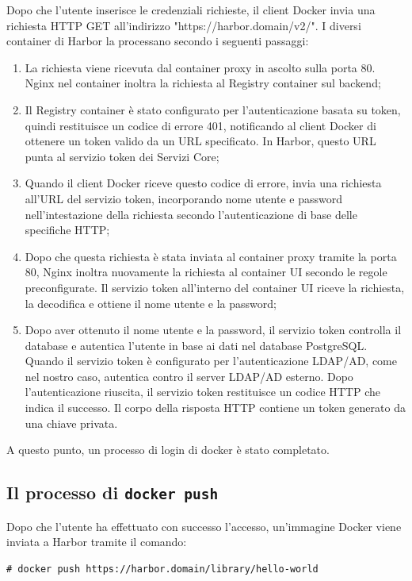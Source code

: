 \documentclass[12pt,a4paper]{report}
\begin{document}
Dopo che l'utente inserisce le credenziali richieste, il client Docker invia una richiesta HTTP GET all'indirizzo "https://harbor.domain/v2/". I diversi container di Harbor la processano secondo i seguenti passaggi:
\begin{enumerate}
    \item La richiesta viene ricevuta dal container proxy in ascolto sulla porta 80. Nginx nel container inoltra la richiesta al Registry container sul backend;
    \item Il Registry container è stato configurato per l'autenticazione basata su token, quindi restituisce un codice di errore 401, notificando al client Docker di ottenere un token valido da un URL specificato. In Harbor, questo URL punta al servizio token dei Servizi Core;
    \item Quando il client Docker riceve questo codice di errore, invia una richiesta all'URL del servizio token, incorporando nome utente e password nell'intestazione della richiesta secondo l'autenticazione di base delle specifiche HTTP;
    \item Dopo che questa richiesta è stata inviata al container proxy tramite la porta 80, Nginx inoltra nuovamente la richiesta al container UI secondo le regole preconfigurate. Il servizio token all'interno del container UI riceve la richiesta, la decodifica e ottiene il nome utente e la password;
    \item Dopo aver ottenuto il nome utente e la password, il servizio token controlla il database e autentica l'utente in base ai dati nel database PostgreSQL. Quando il servizio token è configurato per l'autenticazione LDAP/AD, come nel nostro caso, autentica contro il server LDAP/AD esterno. Dopo l'autenticazione riuscita, il servizio token restituisce un codice HTTP che indica il successo. Il corpo della risposta HTTP contiene un token generato da una chiave privata.
\end{enumerate}
A questo punto, un processo di login di docker è stato completato.

\subsection{Il processo di \texttt{docker push}}

Dopo che l'utente ha effettuato con successo l'accesso, un'immagine Docker viene inviata a Harbor tramite il comando:
\begin{verbatim}
# docker push https://harbor.domain/library/hello-world
\end{verbatim}
\end{document}
